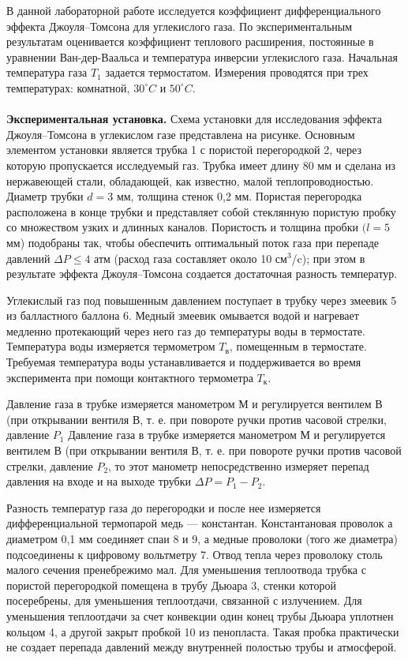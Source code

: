 \documentclass[a4paper, 12pt]{article}
\begin{document}
\indent В данной лабораторной работе исследуется коэффициент дифференциального эффекта Джоуля–Томсона для углекислого газа. По экспериментальным результатам оценивается коэффициент теплового расширения, постоянные в уравнении Ван-дер-Ваальса и температура инверсии углекислого газа. Начальная температура газа $T_{1}$ задается термостатом. Измерения проводятся при трех температурах: комнатной, $30^\circ C$ и $50^\circ C.$
\\
\\
\noindent \textbf{Экспериментальная установка.} Схема установки для исследования эффекта Джоуля–Томсона в углекислом газе представлена на рисунке. Основным элементом установки является трубка 1 с пористой перегородкой 2, через которую пропускается исследуемый газ. Трубка имеет длину 80 мм и сделана из нержавеющей стали, обладающей, как известно, малой теплопроводностью. Диаметр трубки $d = 3$ мм, толщина стенок 0,2 мм. Пористая перегородка расположена в конце трубки и представляет собой стеклянную пористую пробку со множеством узких и длинных каналов. Пористость и толщина пробки $(l = 5$ мм) подобраны так, чтобы обеспечить оптимальный поток газа при перепаде давлений $\Delta P \leqslant 4$ атм (расход газа составляет около 10 см$^3$/c); при этом в результате эффекта Джоуля–Томсона создается достаточная разность температур.

\indent Углекислый газ под повышенным давлением поступает в трубку через змеевик 5 из балластного баллона 6. Медный змеевик омывается водой и нагревает медленно протекающий через него газ до температуры воды в термостате. Температура воды измеряется термометром $T_{\text{в}}$, помещенным в термостате. Требуемая температура воды устанавливается и поддерживается во время эксперимента при помощи контактного термометра $T_{\text{к}}$.

\indent Давление газа в трубке измеряется манометром М и регулируется вентилем В (при открывании вентиля В, т. е. при повороте ручки против часовой стрелки, давление $P_{1}$ Давление газа в трубке измеряется манометром М и регулируется вентилем В (при открывании вентиля В, т. е. при повороте ручки против часовой стрелки, давление $P_{2}$, то этот манометр непосредственно измеряет перепад давления на входе и на выходе трубки $\Delta P = P_{1} - P_{2}.$

\indent Разность температур газа до перегородки и после нее измеряется дифференциальной термопарой медь — константан. Константановая проволок а диаметром 0,1 мм соединяет спаи 8 и 9, а медные проволоки (того же диаметра) подсоединены к цифровому вольтметру 7. Отвод тепла через проволоку столь малого сечения пренебрежимо мал. Для уменьшения теплоотвода трубка с пористой перегородкой помещена в трубу Дьюара 3, стенки которой посеребрены, для уменьшения теплоотдачи, связанной с излучением. Для уменьшения теплоотдачи за счет конвекции один конец трубы Дьюара уплотнен кольцом 4, а другой закрыт пробкой 10 из пенопласта. Такая пробка практически не создает перепада давлений между внутренней полостью трубы и атмосферой.
\\
\\
\\
\\
\end{document}
